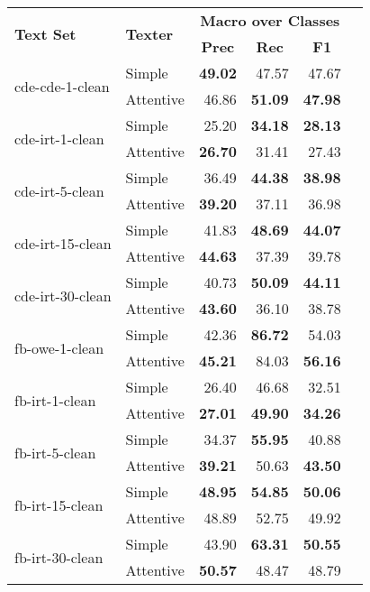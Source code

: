 \begin{tabular}{| l | l | r | r | r | r |}
    \hline

    \multirow{2}{*}{\textbf{Text Set}} &
    \multirow{2}{*}{\textbf{Texter}} &
    \multicolumn{3}{|c|}{\textbf{Macro over Classes}} \\

    & &
    \multicolumn{1}{|c|}{\textbf{Prec}} &
    \multicolumn{1}{|c|}{\textbf{Rec}} &
    \multicolumn{1}{|c|}{\textbf{F1}} \\ \hline \hline

    \multirow{2}{*}{cde-cde-1-clean}
    & Simple    & \textbf{49.02} & 47.57 & 47.67 \\
    & Attentive & 46.86 & \textbf{51.09} & \textbf{47.98} \\ \hline

    \multirow{2}{*}{cde-irt-1-clean}
    & Simple    & 25.20 & \textbf{34.18} & \textbf{28.13} \\
    & Attentive & \textbf{26.70} & 31.41 & 27.43 \\ \hline

    \multirow{2}{*}{cde-irt-5-clean}
    & Simple    & 36.49 & \textbf{44.38} & \textbf{38.98} \\
    & Attentive & \textbf{39.20} & 37.11 & 36.98 \\ \hline

    \multirow{2}{*}{cde-irt-15-clean}
    & Simple    & 41.83 & \textbf{48.69} & \textbf{44.07} \\
    & Attentive & \textbf{44.63} & 37.39 & 39.78 \\ \hline

    \multirow{2}{*}{cde-irt-30-clean}
    & Simple    & 40.73 & \textbf{50.09} & \textbf{44.11} \\
    & Attentive & \textbf{43.60} & 36.10 & 38.78 \\ \hline \hline

    \multirow{2}{*}{fb-owe-1-clean}
    & Simple    & 42.36 & \textbf{86.72} & 54.03 \\
    & Attentive & \textbf{45.21} & 84.03 & \textbf{56.16} \\ \hline

    \multirow{2}{*}{fb-irt-1-clean}
    & Simple    & 26.40 & 46.68 & 32.51 \\
    & Attentive & \textbf{27.01} & \textbf{49.90} & \textbf{34.26} \\ \hline

    \multirow{2}{*}{fb-irt-5-clean}
    & Simple    & 34.37 & \textbf{55.95} & 40.88 \\
    & Attentive & \textbf{39.21} & 50.63 & \textbf{43.50} \\ \hline

    \multirow{2}{*}{fb-irt-15-clean}
    & Simple    & \textbf{48.95} & \textbf{54.85} & \textbf{50.06} \\
    & Attentive & 48.89 & 52.75 & 49.92 \\ \hline

    \multirow{2}{*}{fb-irt-30-clean}
    & Simple    & 43.90 & \textbf{63.31} & \textbf{50.55} \\
    & Attentive & \textbf{50.57} & 48.47 & 48.79 \\ \hline
\end{tabular}

